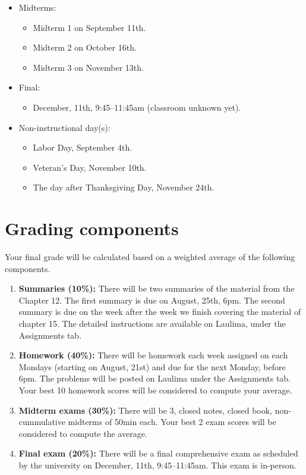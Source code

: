 \documentclass[12pt]{amsart}
\begin{document}
	\begin{itemize}
	\item Midterms:
		\begin{itemize}
		\item Midterm 1 on September 11th.
		\item Midterm 2 on October 16th.
		\item Midterm 3 on November 13th.
		\end{itemize}
	\item Final:
		\begin{itemize}
		\item December, 11th, 9:45--11:45am (classroom unknown yet).
		\end{itemize}
	\item Non-instructional day(s):
		\begin{itemize}
		\item Labor Day, September 4th.
		\item Veteran's Day, November 10th.
		\item The day after Thanksgiving Day, November 24th.
		\end{itemize}
	\end{itemize}

\section*{Grading components}
Your final grade will be calculated based on a weighted average of the following components.

\begin{enumerate}
\item{\bf Summaries (10\%):} There will be two summaries of the material from the Chapter 12. The first summary is due on August, 25th, 6pm. The second summary is due on the week after the week we finish covering the material of chapter 15. The detailed instructions are available on Laulima, under the Assignments tab.
\item{\bf Homework (40\%):} There will be homework each week assigned on each Mondays (starting on August, 21st) and due for the next Monday, before 6pm. The problems will be posted on Laulima under the Assignments tab. Your best 10 homework scores will be considered to compute your average.
\item {\bf Midterm exams (30\%):} There will be 3, closed notes, closed book, non-cummulative midterms of 50min each. Your best 2 exam scores will be considered to compute the average.
\item {\bf Final exam (20\%):} There will be a final comprehensive exam as scheduled by the university on December, 11th, 9:45--11:45am. This exam is in-person.
\end{enumerate}
\end{document}
